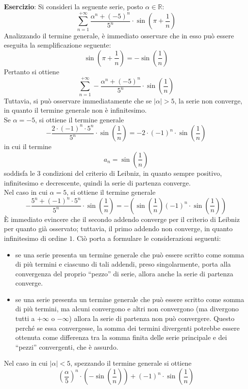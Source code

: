 \documentclass[a4paper]{extarticle}
\newcommand{\quotes}[1]{``#1''}
\begin{document}
\newpage
\noindent
\textbf{Esercizio}: Si consideri la seguente serie, posto $\alpha \in \mathbb{R}$:
\[\sum_{n=1}^{+\infty} \frac{\alpha^n + (-5)^n}{5^n} \cdot \sin \left(\pi + \frac{1}{n}\right)\]
Analizzando il termine generale, è immediato osservare che in esso può essere eseguita la semplificazione seguente:
\[\sin \left(\pi + \frac{1}{n}\right) = - \sin \left(\frac{1}{n}\right)\]
Pertanto si ottiene
\[\sum_{n=1}^{+\infty} - \frac{\alpha^n+(-5)^n}{5^n} \cdot \sin \left(\frac{1}{n}\right)\]
Tuttavia, si può osservare immediatamente che se $\left \vert \alpha \right \vert > 5$, la serie non converge, in quanto il termine generale non è infinitesimo.\\
Se $\alpha=-5$, si ottiene il termine generale
\[- \frac{2 \cdot (-1)^n \cdot 5^n}{5^n} \cdot \sin \left(\frac{1}{n}\right) = -2 \cdot (-1)^n \cdot \sin \left(\frac{1}{n} \right)\]
in cui il termine
\[a_n = \sin \left(\frac{1}{n} \right)\]
soddisfa le $3$ condizioni del criterio di Leibniz, in quanto sempre positivo, infinitesimo e decrescente, quindi la serie di partenza converge.\\
Nel caso in cui $\alpha=5$, si ottiene il termine generale
\[- \frac{5^n + (-1)^n \cdot 5^n}{5^n} \cdot \sin \left(\frac{1}{n}\right) = - \left( \sin \left(\frac{1}{n}\right) (-1)^n \cdot \sin \left(\frac{1}{n}\right)\right)\]
È immediato evincere che il secondo addendo converge per il criterio di Leibniz per quanto già osservato; tuttavia, il primo addendo non converge, in quanto infinitesimo di ordine $1$. Ciò porta a formulare le considerazioni seguenti:
\begin{itemize}
    \item se una serie presenta un termine generale che può essere scritto come somma di più termini e ciascuno di tali addendi, preso singolarmente, porta alla convergenza del proprio \quotes{pezzo} di serie, allora anche la serie di partenza converge.
    \item se una serie presenta un termine generale che può essere scritto come somma di più termini, ma alcuni convergono e altri non convergono (ma divergono tutti a $+\infty$ o $-\infty$) allora la serie di partenza non può convergere. Questo perché se essa convergesse, la somma dei termini divergenti potrebbe essere ottenuta come differenza tra la somma finita delle serie principale e dei \quotes{pezzi} convergenti, che è assurdo.
\end{itemize}
Nel caso in cui $\vert \alpha \vert < 5$, spezzando il termine generale si ottiene
\[\left(\frac{\alpha}{5}\right)^n \cdot \left(-\sin \left( \frac{1}{n}\right)\right) + (-1)^n \cdot \sin \left(\frac{1}{n}\right)\]
\end{document}
